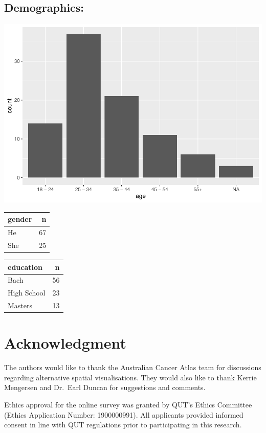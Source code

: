\documentclass[conference,final,]{IEEEtran}
\makeatletter
\def\maxwidth{\ifdim\Gin@nat@width>\linewidth\linewidth
\else\Gin@nat@width\fi}
\let\Oldincludegraphics\includegraphics
\renewcommand{\includegraphics}[1]{\Oldincludegraphics[width=\maxwidth]{#1}}
\makeatother
\begin{document}
\hypertarget{demographics}{%
\subsection{Demographics:}\label{demographics}}

\includegraphics{paper_files/figure-latex/demogs-1.pdf}

\begin{tabular}{lr}
\toprule
gender & n\\
\midrule
He & 67\\
She & 25\\
\bottomrule
\end{tabular}

\begin{tabular}{lr}
\toprule
education & n\\
\midrule
Bach & 56\\
High School & 23\\
Masters & 13\\
\bottomrule
\end{tabular}

\hypertarget{acknowledgment}{%
\section{Acknowledgment}\label{acknowledgment}}

The authors would like to thank the Australian Cancer Atlas team for discussions regarding alternative spatial visualisations. They would also like to thank Kerrie Mengersen and Dr.~Earl Duncan for suggestions and comments.

Ethics approval for the online survey was granted by QUT's Ethics Committee (Ethics Application Number: 1900000991). All applicants provided informed consent in line with QUT regulations prior to participating in this research.
\end{document}
